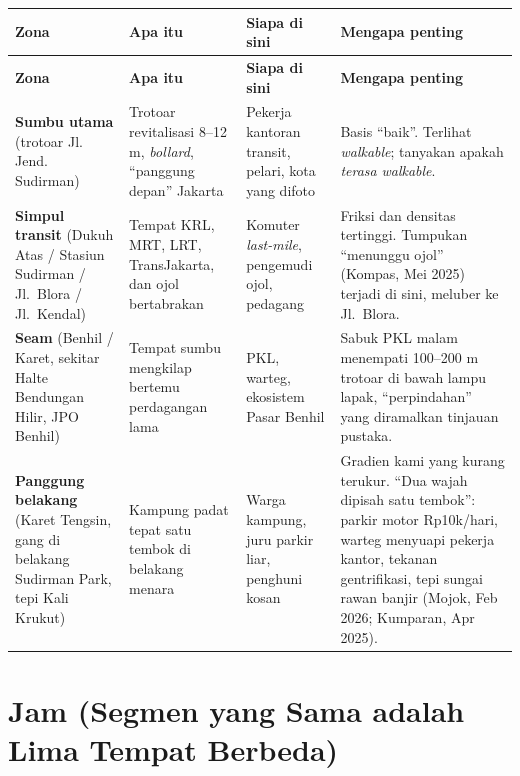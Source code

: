 \documentclass[11pt,a4paper]{report}
\begin{document}
\begin{longtable}{@{}p{2.8cm}p{4.2cm}p{3.2cm}p{4.3cm}@{}}
\toprule
\textbf{Zona} & \textbf{Apa itu} & \textbf{Siapa di sini} & \textbf{Mengapa penting} \\
\midrule
\endfirsthead
\toprule
\textbf{Zona} & \textbf{Apa itu} & \textbf{Siapa di sini} & \textbf{Mengapa penting} \\
\midrule
\endhead
\textbf{Sumbu utama} (trotoar Jl. Jend. Sudirman) &
Trotoar revitalisasi 8--12 m, \emph{bollard}, ``panggung depan'' Jakarta &
Pekerja kantoran transit, pelari, kota yang difoto &
Basis ``baik''. Terlihat \emph{walkable}; tanyakan apakah \emph{terasa} \emph{walkable}. \\
\addlinespace
\textbf{Simpul transit} (Dukuh Atas / Stasiun Sudirman / Jl.\ Blora / Jl.\ Kendal) &
Tempat KRL, MRT, LRT, TransJakarta, dan ojol bertabrakan &
Komuter \emph{last-mile}, pengemudi ojol, pedagang &
Friksi dan densitas tertinggi. Tumpukan ``menunggu ojol'' (Kompas, Mei 2025) terjadi
di sini, meluber ke Jl.\ Blora. \\
\addlinespace
\textbf{Seam} (Benhil / Karet, sekitar Halte Bendungan Hilir, JPO Benhil) &
Tempat sumbu mengkilap bertemu perdagangan lama &
PKL, warteg, ekosistem Pasar Benhil &
Sabuk PKL malam menempati 100--200 m trotoar di bawah lampu lapak, ``perpindahan''
yang diramalkan tinjauan pustaka. \\
\addlinespace
\textbf{Panggung belakang} (Karet Tengsin, gang di belakang Sudirman Park, tepi Kali Krukut) &
Kampung padat tepat satu tembok di belakang menara &
Warga kampung, juru parkir liar, penghuni kosan &
Gradien kami yang kurang terukur. ``Dua wajah dipisah satu tembok'': parkir motor
Rp10k/hari, warteg menyuapi pekerja kantor, tekanan gentrifikasi, tepi sungai rawan
banjir (Mojok, Feb 2026; Kumparan, Apr 2025). \\
\bottomrule
\end{longtable}

\section{Jam (Segmen yang Sama adalah Lima Tempat Berbeda)}
\end{document}
